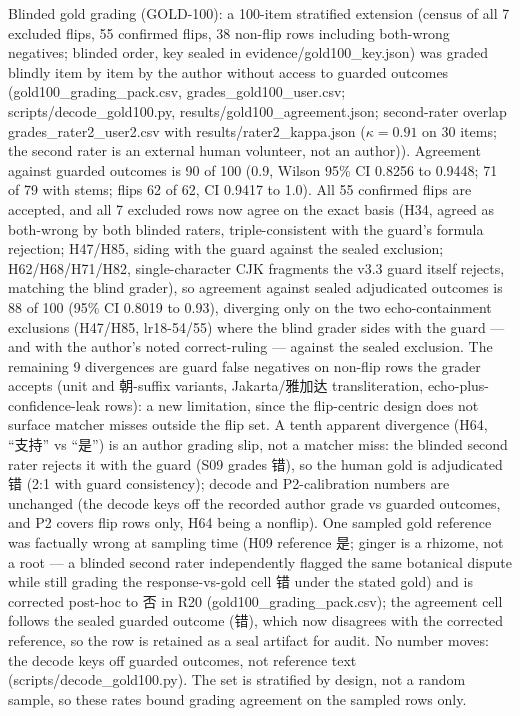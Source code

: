 \documentclass[10pt]{article} %
\begin{document}
Blinded gold grading (GOLD-100): a 100-item stratified extension (census of all 7 excluded flips, 55 confirmed flips, 38 non-flip rows including both-wrong negatives; blinded order, key sealed in evidence/gold100\_key.json) was graded blindly item by item by the author without access to guarded outcomes (gold100\_grading\_pack.csv, grades\_gold100\_user.csv; scripts/decode\_gold100.py, results/gold100\_agreement.json; second-rater overlap grades\_rater2\_user2.csv with results/rater2\_kappa.json ($\kappa=0.91$ on 30 items; the second rater is an external human volunteer, not an author)). Agreement against guarded outcomes is 90 of 100 (0.9, Wilson 95\% CI 0.8256 to 0.9448; 71 of 79 with stems; flips 62 of 62, CI 0.9417 to 1.0). All 55 confirmed flips are accepted, and all 7 excluded rows now agree on the exact basis (H34, agreed as both-wrong by both blinded raters, triple-consistent with the guard's formula rejection; H47/H85, siding with the guard against the sealed exclusion; H62/H68/H71/H82, single-character CJK fragments the v3.3 guard itself rejects, matching the blind grader), so agreement against sealed adjudicated outcomes is 88 of 100 (95\% CI 0.8019 to 0.93), diverging only on the two echo-containment exclusions (H47/H85, lr18-54/55) where the blind grader sides with the guard --- and with the author's noted correct-ruling --- against the sealed exclusion. The remaining 9 divergences are guard false negatives on non-flip rows the grader accepts (unit and 朝-suffix variants, Jakarta/雅加达 transliteration, echo-plus-confidence-leak rows): a new limitation, since the flip-centric design does not surface matcher misses outside the flip set. A tenth apparent divergence (H64, ``支持'' vs ``是'') is an author grading slip, not a matcher miss: the blinded second rater rejects it with the guard (S09 grades 错), so the human gold is adjudicated 错 (2:1 with guard consistency); decode and P2-calibration numbers are unchanged (the decode keys off the recorded author grade vs guarded outcomes, and P2 covers flip rows only, H64 being a nonflip). One sampled gold reference was factually wrong at sampling time (H09 reference 是; ginger is a rhizome, not a root --- a blinded second rater independently flagged the same botanical dispute while still grading the response-vs-gold cell 错 under the stated gold) and is corrected post-hoc to 否 in R20 (gold100\_grading\_pack.csv); the agreement cell follows the sealed guarded outcome (错), which now disagrees with the corrected reference, so the row is retained as a seal artifact for audit. No number moves: the decode keys off guarded outcomes, not reference text (scripts/decode\_gold100.py). The set is stratified by design, not a random sample, so these rates bound grading agreement on the sampled rows only.
\end{document}
